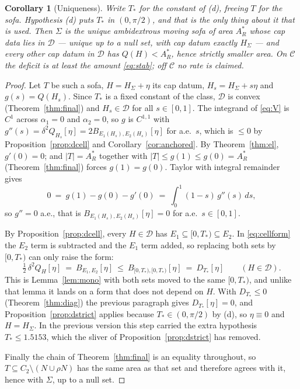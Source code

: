 \documentclass[11pt]{article}
\newtheorem{corollary}[theorem]{Corollary}
\theoremstyle{definition}
\newcommand{\Sig}{\Sigma}
\begin{document}
\begin{corollary}[Uniqueness]\label{cor:uniq}
Write $T_\ast$ for the constant of (d), freeing $T$ for the sofa. Hypothesis (d) puts
$T_\ast$ in $(0,\pi/2)$, and that is the only thing about it that is used. Then $\Sig$ is the
unique ambidextrous moving sofa of area
$A_R^\ast$ whose cap
data lies in $\mathcal D$ --- unique up to a null set, with cap datum exactly $H_\Sig$ ---
and every other cap datum in $\mathcal D$ has $Q(H)<A_R^\ast$, hence strictly smaller area.
On $\mathcal C$ the deficit is at least the amount \eqref{eq:stab}; off $\mathcal C$ no rate
is claimed.
\end{corollary}

\begin{proof}
Let $T$ be such a sofa, $H=H_\Sig+\eta$ its cap datum, $H_s=H_\Sig+s\eta$ and $g(s)=Q(H_s)$.
Since $T_\ast$ is a fixed constant of the class, $\mathcal D$ is convex
(Theorem~\ref{thm:final}) and $H_s\in\mathcal D$ for all $s\in[0,1]$.
The integrand of \eqref{eq:V} is $C^1$ across $\alpha_1=0$ and $\alpha_2=0$, so $g$ is
$C^{1,1}$ with $g''(s)=\delta^2Q_{H_s}[\eta]=2B_{E_1(H_s),E_2(H_s)}[\eta]$ for a.e.\ $s$,
which is $\le0$ by Proposition~\ref{prop:dcell} and Corollary~\ref{cor:anchored}. By
Theorem~\ref{thm:el}, $g'(0)=0$; and $|T|=A_R^\ast$ together with $|T|\le g(1)\le
g(0)=A_R^\ast$ (Theorem~\ref{thm:final}) forces $g(1)=g(0)$. Taylor with integral remainder
gives
\[
  0\ =\ g(1)-g(0)-g'(0)\ =\ \int_0^1(1-s)\,g''(s)\,ds ,
\]
so $g''=0$ a.e., that is $B_{E_1(H_s),E_2(H_s)}[\eta]=0$ for a.e.\ $s\in[0,1]$.

By Proposition~\ref{prop:dcell}, every $H\in\mathcal D$ has
$E_1\subseteq[0,T_\ast)\subseteq E_2$. In \eqref{eq:cellform} the $E_2$ term is subtracted and
the $E_1$ term added, so replacing both sets by $[0,T_\ast)$ can only raise the form:
\begin{equation}\label{eq:BleD}
  \tfrac12\,\delta^2Q_H[\eta]\ =\ B_{E_1,E_2}[\eta]\ \le\ B_{[0,T_\ast),[0,T_\ast)}[\eta]
  \ =\ D_{T_\ast}[\eta]\qquad (H\in\mathcal D).
\end{equation}
This is Lemma~\ref{lem:mono} with both sets moved to the same $[0,T_\ast)$, and unlike that
lemma it lands on a form that does not depend on $H$. With $D_{T_\ast}\le0$
(Theorem~\ref{thm:diag}) the previous paragraph gives $D_{T_\ast}[\eta]=0$, and
Proposition~\ref{prop:dstrict} applies because $T_\ast\in(0,\pi/2)$ by (d), so $\eta\equiv0$
and $H=H_\Sig$. In the previous version this step carried the extra hypothesis
$T_\ast\le1.5153$, which the sliver of Proposition~\ref{prop:dstrict} has removed.

Finally the chain of Theorem~\ref{thm:final} is an equality throughout, so
$T\subseteq C_2\setminus(N\cup\rho N)$ has the same area as that set and therefore agrees
with it, hence with $\Sig$, up to a null set.
\end{proof}
\end{document}
